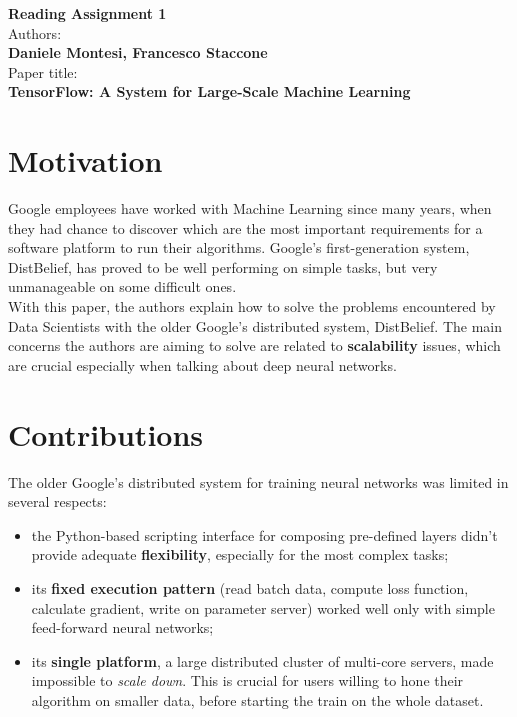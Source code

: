\documentclass[10pt]{proc}
\begin{document}
\large{\textbf{Reading Assignment 1}}\\

\large{Authors:\textbf{ \\Daniele Montesi, Francesco Staccone}}\\

\large{Paper title:\textbf{\\TensorFlow: A System for Large-Scale
Machine Learning}}\\
\section{Motivation}
Google employees have worked with Machine Learning since many years, when they had chance to discover which are the most important requirements for a software platform to run their algorithms. Google's first-generation system, DistBelief, has proved to be well performing on simple tasks, but very unmanageable on some difficult ones. \\
With this paper, the authors explain how to solve the problems encountered by Data Scientists with the older Google's distributed system, DistBelief.
The main concerns the authors are aiming to solve are related to \textbf{scalability} issues, which are crucial especially when talking about deep neural networks.\\

\section{Contributions}
The older Google's distributed system for training neural networks was limited in several respects:
\begin{itemize}
    \item the Python-based scripting interface for composing pre-defined layers didn't provide adequate \textbf{flexibility}, especially for the most complex tasks;
    \item its \textbf{fixed execution pattern} (read batch data, compute loss function, calculate gradient, write on parameter server) worked well only with simple feed-forward neural networks;
    \item its \textbf{single platform}, a large distributed cluster of multi-core servers, made impossible to \textit{scale down}. This is crucial for users willing to hone their algorithm on smaller data, before starting the train on the whole dataset.
\end{itemize}{}
\end{document}
